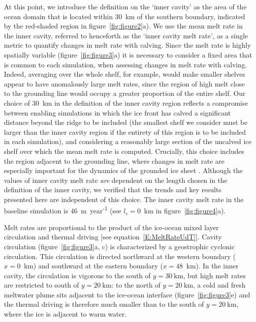\documentclass[draft]{agujournal2019}
\begin{document}
At this point, we introduce the definition on the `inner cavity' as the area of the ocean domain that is located within 30~km of the southern boundary, indicated by the red-shaded region in figure~\ref{fig:figure2}a). We use the mean melt rate in the inner cavity, referred to henceforth as the `inner cavity melt rate', as a single metric to quantify changes in melt rate with calving. Since the melt rate is highly spatially variable (figure~\ref{fig:figure3}a) it is necessary to consider a fixed area that is common to each simulation, when assessing changes in melt rate with calving. Indeed, averaging over the whole shelf, for example, would make smaller shelves appear to have anomalously large melt rates, since the region of high melt close to the grounding line would occupy a greater proportion of the entire shelf. Our choice of 30~km in the definition of the inner cavity region reflects a compromise between enabling simulations in which the ice front has calved a significant distance beyond the ridge to be included (the smallest shelf we consider must be larger than the inner cavity region if the entirety of this region is to be included in each simulation), and considering a reasonably large section of the uncalved ice shelf over which the mean melt rate is computed. Crucially, this choice includes the region adjacent to the grounding line, where changes in melt rate are especially important for the dynamics of the grounded ice sheet \cite{Seroussi2014Cryo, Athern2017GRL}. Although the values of inner cavity melt rate \textit{are} dependent on the length chosen in the definition of the inner cavity, we verified that the trends and key results presented here are independent of this choice. The inner cavity melt rate in the baseline simulation is 46~m~year\textsuperscript{-1} (see $l_c = 0$~km in figure~\ref{fig:figure4}a).

Melt rates are proportional to the product of the ice-ocean mixed layer circulation and thermal driving [see equation~\eqref{E:MeltRateUdT}]. Cavity circulation (figure~\ref{fig:figure3}a, c) is characterized by a geostrophic cyclonic circulation. This circulation is directed northward at the western boundary ($x=0$~km) and southward at the eastern boundary ($x=48$~km). In the inner cavity, the circulation is vigorous to the south of $y=30~\text{km}$, but high melt rates are restricted to south of $y=20~\text{km}$: to the north of $y=20~\text{km}$, a cold and fresh meltwater plume sits adjacent to the ice-ocean interface (figure~\ref{fig:figure3}e) and the thermal driving is therefore much smaller than to the south of $y=20~\text{km}$, where the ice is adjacent to warm water.
\end{document}
